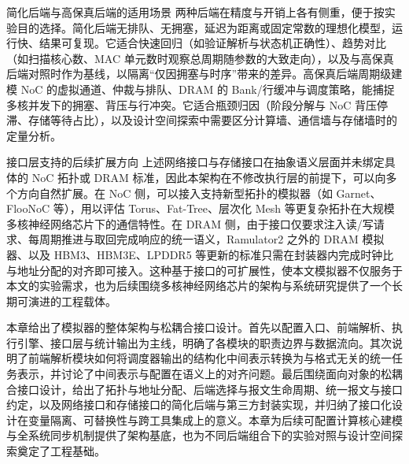简化后端与高保真后端的适用场景 两种后端在精度与开销上各有侧重，便于按实验目的选择。简化后端无排队、无拥塞，延迟为距离或固定常数的理想化模型，运行快、结果可复现。它适合快速回归（如验证解析与状态机正确性）、趋势对比（如扫描核心数、MAC 单元数时观察总周期随参数的大致走向），以及与高保真后端对照时作为基线，以隔离“仅因拥塞与时序”带来的差异。高保真后端周期级建模 NoC 的虚拟通道、仲裁与排队、DRAM 的 Bank/行缓冲与调度策略，能捕捉多核并发下的拥塞、背压与行冲突。它适合瓶颈归因（阶段分解与 NoC 背压停滞、存储等待占比），以及设计空间探索中需要区分计算墙、通信墙与存储墙时的定量分析。

接口层支持的后续扩展方向 上述网络接口与存储接口在抽象语义层面并未绑定具体的 NoC 拓扑或 DRAM 标准，因此本架构在不修改执行层的前提下，可以向多个方向自然扩展。在 NoC 侧，可以接入支持新型拓扑的模拟器（如 Garnet、FlooNoC 等），用以评估 Torus、Fat-Tree、层次化 Mesh 等更复杂拓扑在大规模多核神经网络芯片下的通信特性。在 DRAM 侧，由于接口仅要求注入读/写请求、每周期推进与取回完成响应的统一语义，Ramulator2 之外的 DRAM 模拟器、以及 HBM3、HBM3E、LPDDR5 等更新的标准只需在封装器内完成时钟比与地址分配的对齐即可接入。这种基于接口的可扩展性，使本文模拟器不仅服务于本文的实验需求，也为后续围绕多核神经网络芯片的架构与系统研究提供了一个长期可演进的工程载体。


本章给出了模拟器的整体架构与松耦合接口设计。首先以配置入口、前端解析、执行引擎、接口层与统计输出为主线，明确了各模块的职责边界与数据流向。其次说明了前端解析模块如何将调度器输出的结构化中间表示转换为与格式无关的统一任务表示，并讨论了中间表示与配置在语义上的对齐问题。最后围绕面向对象的松耦合接口设计，给出了拓扑与地址分配、后端选择与报文生命周期、统一报文与接口约定，以及网络接口和存储接口的简化后端与第三方封装实现，并归纳了接口化设计在变量隔离、可替换性与跨工具集成上的意义。本章为后续可配置计算核心建模与全系统同步机制提供了架构基底，也为不同后端组合下的实验对照与设计空间探索奠定了工程基础。
